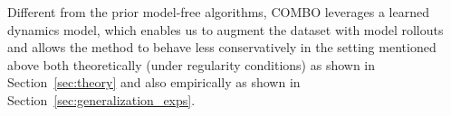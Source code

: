 Different from the prior model-free algorithms, COMBO leverages a learned dynamics model, which enables us to augment the dataset with model rollouts and allows the method to behave less conservatively in the setting mentioned above both theoretically (under regularity conditions) as shown in Section~\ref{sec:theory} and also empirically as shown in Section~\ref{sec:generalization_exps}.

